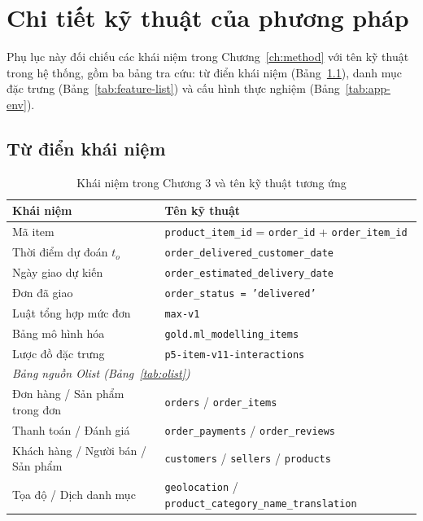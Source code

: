 \chapter{Chi tiết kỹ thuật của phương pháp}\label{app:tech}

Phụ lục này đối chiếu các khái niệm trong Chương~\ref{ch:method} với tên kỹ thuật trong hệ thống, gồm ba bảng tra cứu: từ điển khái niệm (Bảng~\ref{tab:app-dict}), danh mục đặc trưng (Bảng~\ref{tab:feature-list}) và cấu hình thực nghiệm (Bảng~\ref{tab:app-env}).

\section{Từ điển khái niệm}\label{app:ids}
\begin{table}[htbp]\centering\small
\caption{Khái niệm trong Chương 3 và tên kỹ thuật tương ứng}\label{tab:app-dict}
\begin{tabular}{p{4.6cm}p{9.2cm}}
\toprule
Khái niệm & Tên kỹ thuật \\
\midrule
Mã item         & \texttt{product\_item\_id} = \texttt{order\_id} + \texttt{order\_item\_id} \\
Thời điểm dự đoán $t_o$ & \texttt{order\_delivered\_customer\_date} \\
Ngày giao dự kiến & \texttt{order\_estimated\_delivery\_date} \\
Đơn đã giao     & \texttt{order\_status = 'delivered'} \\
Luật tổng hợp mức đơn & \texttt{max-v1} \\
Bảng mô hình hóa & \texttt{gold.ml\_modelling\_items} \\
Lược đồ đặc trưng & \texttt{p5-item-v11-interactions} \\
\midrule
\multicolumn{2}{l}{\emph{Bảng nguồn Olist (Bảng~\ref{tab:olist})}} \\
Đơn hàng / Sản phẩm trong đơn & \texttt{orders} / \texttt{order\_items} \\
Thanh toán / Đánh giá & \texttt{order\_payments} / \texttt{order\_reviews} \\
Khách hàng / Người bán / Sản phẩm & \texttt{customers} / \texttt{sellers} / \texttt{products} \\
Tọa độ / Dịch danh mục & \texttt{geolocation} / \texttt{product\_category\_name\_translation} \\
\bottomrule
\end{tabular}
\end{table}

